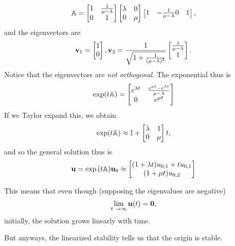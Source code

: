 \documentclass[reqno, a4paper]{article}
\begin{document}
\[
	\mathbb{A} = \begin{bmatrix}
		1 & \frac{1}{\mu - \lambda} \\
		0 & 1 
	\end{bmatrix}
	\begin{bmatrix}
		\lambda & 0 \\
		0 & \mu 
	\end{bmatrix}
	\begin{bmatrix}
		1 & - \frac{1}{\mu - \lambda}
		0 & 1
	\end{bmatrix},
\]
and the eigenvectors are
\[
	\vb{v}_1 = \begin{bmatrix}
		1 \\
		0
		\end{bmatrix}, \vb{v}_2 = \frac{1}{\sqrt{1+ \frac{1}{(\mu-\lambda)^{2}}}}\begin{bmatrix}
		\frac{1}{\mu- \lambda}\\
		1
	\end{bmatrix}.
\]
Notice that the eigenvectors are \textit{not orthogonal}. The exponential thus is
\[
	\exp(t \mathbb{A}) = \begin{bmatrix}
		e^{\lambda t} & \frac{e^{\mu t} - e^{\lambda t}}{\mu - \lambda}\\
		0 & e^{\mu t}
	\end{bmatrix}
\]
If we Taylor expand this, we obtain
\[
	\exp(t \mathbb{A}) \approx \mathbb{I} + \begin{bmatrix}
		\lambda & 1 \\
		0 & \mu
	\end{bmatrix}t,
\]
and so the general solution thus is
\[
	\vb{u} = \exp\qty(t \mathbb{A}) \vb{u}_0 \approx \begin{bmatrix}
		\qty(1+\lambda t)u_{0,1}+ t u_{0,1} \\
		(1+\mu t) u_{0,2}
	\end{bmatrix}
\]

This means that even though (supposing the eigenvalues are negative)
\[
	\lim_{t\ \to \infty} \vb{u}(t) = \vb{0},
\]
initially, the solution grows linearly with time. 

But anyways, the linearized stability tells us that the origin is stable.
\end{document}
